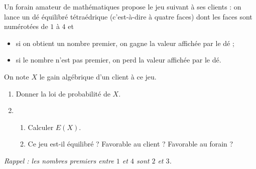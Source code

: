\documentclass[11pt]{article}
\begin{document}
\newpage
\begin{exo}[$2$ points]
  Un forain amateur de mathématiques propose le jeu suivant à ses clients : on
  lance un dé équilibré tétraédrique (c'est-à-dire à quatre faces) dont les
  faces sont numérotées de $1$ à $4$ et
  \begin{itemize}
    \item si on obtient un nombre premier, on gagne la valeur affichée par le dé ;
    \item si le nombre n'est pas premier, on perd la valeur affichée par le dé.
  \end{itemize}
  On note $X$ le gain algébrique d'un client à ce jeu.
  \begin{enumerate}
    \item Donner la loi de probabilité de $X$.
    \item \begin{enumerate}
        \item Calculer $E(X)$.
        \item Ce jeu est-il équilibré ? Favorable au client ? Favorable au
          forain ?
      \end{enumerate}
  \end{enumerate}
  \emph{Rappel : les nombres premiers entre $1$ et $4$ sont $2$ et $3$.}
\end{exo}
\end{document}

